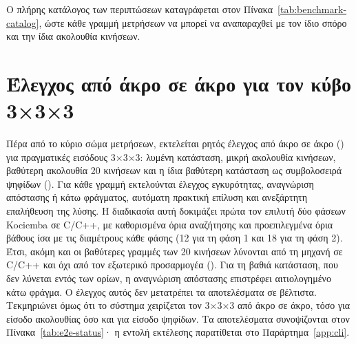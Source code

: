 \begin{table}[htbp]\centering

\caption[Σύνοψη των συνόλων περιπτώσεων του κύριου σώματος μετρήσεων]{Σύνοψη των συνόλων περιπτώσεων A, B και C του κύριου σώματος μετρήσεων: πλήθος περιπτώσεων και εύρος ονομαστικού βάθους ανακατέματος. Πηγή: .}
\label{tab:benchmark-datasets}
\end{table}

Ο πλήρης κατάλογος των περιπτώσεων καταγράφεται στον Πίνακα~\ref{tab:benchmark-catalog}, ώστε κάθε γραμμή μετρήσεων να μπορεί να αναπαραχθεί με τον ίδιο σπόρο και την ίδια ακολουθία κινήσεων.

\begin{table}[htbp]\centering

\caption[Κατάλογος περιπτώσεων του κύριου σώματος μετρήσεων]{Κατάλογος των 13 περιπτώσεων του κύριου σώματος μετρήσεων, με το σύνολο, το ονομαστικό βάθος και την πλήρη ακολουθία ανακατέματος κάθε περίπτωσης. Πηγή: .}
\label{tab:benchmark-catalog}
\end{table}

\section{Έλεγχος από άκρο σε άκρο για τον κύβο 3×3×3}
\label{sec:experiments-e2e}

Πέρα από το κύριο σώμα μετρήσεων, εκτελείται ρητός έλεγχος από άκρο σε άκρο () για πραγματικές εισόδους 3×3×3: λυμένη κατάσταση, μικρή ακολουθία κινήσεων, βαθύτερη ακολουθία 20 κινήσεων και η ίδια βαθύτερη κατάσταση ως συμβολοσειρά ψηφίδων (). Για κάθε γραμμή εκτελούνται έλεγχος εγκυρότητας, αναγνώριση απόστασης ή κάτω φράγματος, αυτόματη πρακτική επίλυση και ανεξάρτητη επαλήθευση της λύσης. Η διαδικασία αυτή δοκιμάζει πρώτα τον επιλυτή δύο φάσεων Kociemba σε C/C++, με καθορισμένα όρια αναζήτησης και προεπιλεγμένα όρια βάθους ίσα με τις διαμέτρους κάθε φάσης (12 για τη φάση 1 και 18 για τη φάση 2). Έτσι, ακόμη και οι βαθύτερες γραμμές των 20 κινήσεων λύνονται από τη μηχανή σε C/C++ και όχι από τον εξωτερικό προσαρμογέα (). Για τη βαθιά κατάσταση, που δεν λύνεται εντός των ορίων, η αναγνώριση απόστασης επιστρέφει αιτιολογημένο κάτω φράγμα. Ο έλεγχος αυτός δεν μετατρέπει τα  αποτελέσματα σε βέλτιστα. Τεκμηριώνει όμως ότι το σύστημα χειρίζεται τον 3×3×3 από άκρο σε άκρο, τόσο για είσοδο ακολουθίας όσο και για είσοδο ψηφίδων. Τα αποτελέσματα συνοψίζονται στον Πίνακα~\ref{tab:e2e-status}· η εντολή εκτέλεσης παρατίθεται στο Παράρτημα~\ref{app:cli}.

